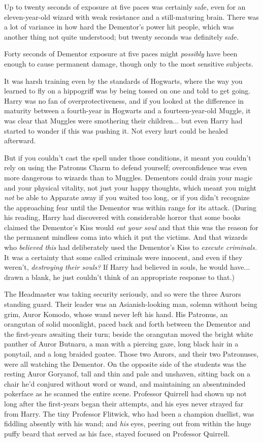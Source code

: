 Up to twenty seconds of exposure at five paces was certainly safe, even for an eleven-year-old wizard with weak resistance and a still-maturing brain. There was a lot of variance in how hard the Dementor's power hit people, which was another thing not quite understood; but twenty seconds was definitely safe.

Forty seconds of Dementor exposure at five paces might \emph{possibly} have been enough to cause permanent damage, though only to the most sensitive subjects.

It was harsh training even by the standards of Hogwarts, where the way you learned to fly on a hippogriff was by being tossed on one and told to get going. Harry was no fan of overprotectiveness, and if you looked at the difference in maturity between a fourth-year in Hogwarts and a fourteen-year-old Muggle, it was clear that Muggles were smothering their children... but even Harry had started to wonder if this was pushing it. Not every hurt could be healed afterward.

But if you couldn't cast the spell under those conditions, it meant you couldn't rely on using the Patronus Charm to defend yourself; overconfidence was even more dangerous to wizards than to Muggles. Dementors could drain your magic and your physical vitality, not just your happy thoughts, which meant you might \emph{not} be able to Apparate away if you waited too long, or if you didn't recognize the approaching fear until the Dementor was within range for its attack. (During his reading, Harry had discovered with considerable horror that some books claimed the Dementor's Kiss would \emph{eat your soul} and that this was the reason for the permanent mindless coma into which it put the victims. And that wizards who \emph{believed this} had deliberately used the Dementor's Kiss to \emph{execute criminals.} It was a certainty that some called criminals were innocent, and even if they weren't, \emph{destroying their souls?} If Harry had believed in souls, he would have... drawn a blank, he just couldn't think of an appropriate response to that.)

The Headmaster was taking security seriously, and so were the three Aurors standing guard. Their leader was an Asianish-looking man, solemn without being grim, Auror Komodo, whose wand never left his hand. His Patronus, an orangutan of solid moonlight, paced back and forth between the Dementor and the first-years awaiting their turn; beside the orangutan moved the bright white panther of Auror Butnaru, a man with a piercing gaze, long black hair in a ponytail, and a long braided goatee. Those two Aurors, and their two Patronuses, were all watching the Dementor. On the opposite side of the students was the resting Auror Goryanof, tall and thin and pale and unshaven, sitting back on a chair he'd conjured without word or wand, and maintaining an absentminded pokerface as he scanned the entire scene. Professor Quirrell had shown up not long after the first-years began their attempts, and his eyes never strayed far from Harry. The tiny Professor Flitwick, who had been a champion duellist, was fiddling absently with his wand; and \emph{his} eyes, peering out from within the huge puffy beard that served as his face, stayed focused on Professor Quirrell.

